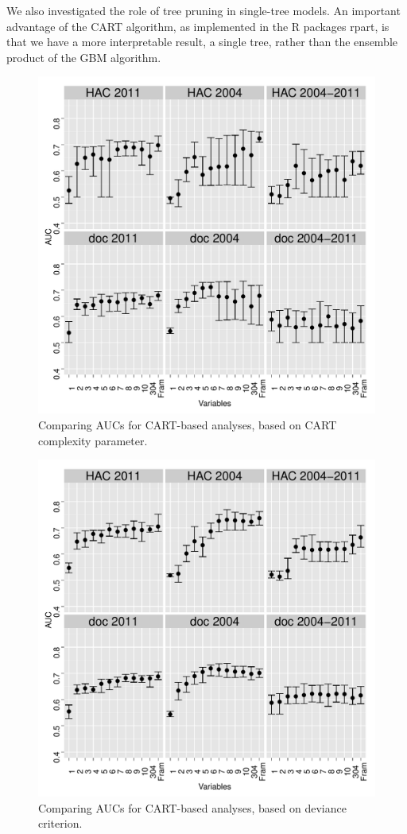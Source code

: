 \documentclass[11pt,]{article}
\begin{document}
We also investigated the role of tree pruning in single-tree models. An
important advantage of the CART algorithm, as implemented in the R
packages rpart, is that we have a more interpretable result, a single
tree, rather than the ensemble product of the GBM algorithm.

\begin{figure}[htbp]
\centering
\includegraphics{from-mike/rpartcv_cp.pdf}
\caption{Comparing AUCs for CART-based analyses, based on CART complexity parameter.}
\label{figure:auc-cp}
\end{figure}

\begin{figure}[htbp]
\centering
\includegraphics{from-mike/rpartcv_dev.pdf}
\caption{Comparing AUCs for CART-based analyses, based on deviance criterion.}
\label{figure:auc-dev}
\end{figure}
\end{document}
